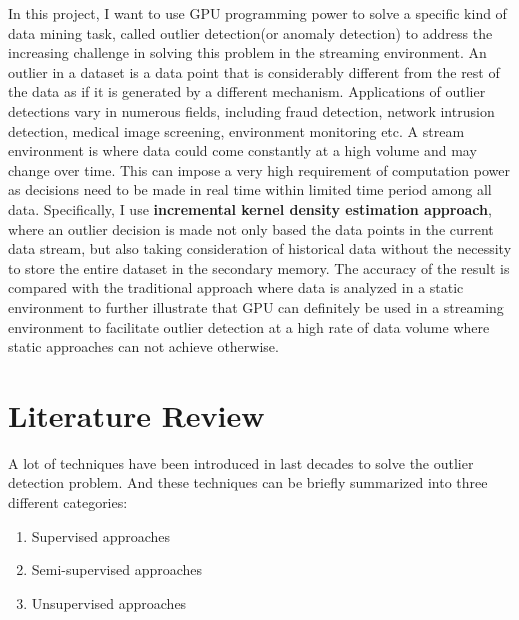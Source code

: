 \documentclass[11pt]{article}       %
\begin{document}
In this project, I want to use GPU programming power to solve a specific kind of data mining task, called outlier detection(or anomaly detection) to address the increasing challenge in solving this problem in the streaming environment. An outlier in a dataset is a data point that is considerably different from the rest of the data as if it is generated by a different mechanism\cite{7516110}. Applications of outlier detections vary in numerous fields, including fraud detection, network intrusion detection, medical image screening, environment monitoring etc. A stream environment is where data could come constantly at a high volume and may change over time. This can impose a very high requirement of computation power as decisions need to be made in real time within limited time period among all data. Specifically, I use \textbf{incremental kernel density estimation approach}, where an outlier decision is made not only based the data points in the current data stream, but also taking consideration of historical data without the necessity to store the entire dataset in the secondary memory. The accuracy of the result is compared with the traditional approach where data is analyzed in a static environment to further illustrate that GPU can definitely be used in a streaming environment to facilitate outlier detection at a high rate of data volume where static approaches can not achieve otherwise.


\section{Literature Review} \label{litrev}

A lot of techniques have been introduced in last decades to solve the outlier detection problem. And these techniques can be briefly summarized into three different categories: 

\begin{enumerate}
  \item Supervised approaches
  \item Semi-supervised approaches
  \item Unsupervised approaches
\end{enumerate}
\end{document}
